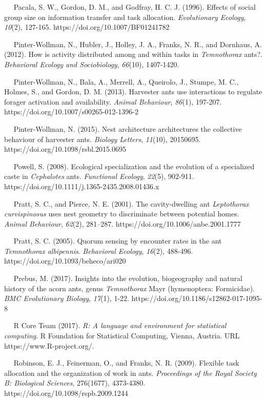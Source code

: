 \documentclass[3p]{elsarticle} %
\begin{document}
~~ Pacala, S. W., Gordon, D. M., and Godfray, H. C. J. (1996). Effects
of social group size on information transfer and task allocation.
\emph{Evolutionary Ecology}, \emph{10}(2), 127-165.
https://doi.org/10.1007/BF01241782

~~ Pinter-Wollman, N., Hubler, J., Holley, J. A., Franks, N. R., and
Dornhaus, A. (2012). How is activity distributed among and within tasks
in \emph{Temnothorax} ants?. \emph{Behavioral Ecology and Sociobiology},
\emph{66}(10), 1407-1420.

~~ Pinter-Wollman, N., Bala, A., Merrell, A., Queirolo, J., Stumpe, M.
C., Holmes, S., and Gordon, D. M. (2013). Harvester ants use
interactions to regulate forager activation and availability.
\emph{Animal Behaviour}, \emph{86}(1), 197-207.
https://doi.org/10.1007/s00265-012-1396-2

~~ Pinter-Wollman, N. (2015). Nest architecture architectures the
collective behaviour of harvester ants. \emph{Biology Letters},
\emph{11}(10), 20150695. https://doi.org/10.1098/rsbl.2015.0695

~~ Powell, S. (2008). Ecological specialization and the evolution of a
specialized caste in \emph{Cephalotes} ants. \emph{Functional Ecology},
\emph{22}(5), 902-911. https://doi.org/10.1111/j.1365-2435.2008.01436.x

~~ Pratt, S. C., and Pierce, N. E. (2001). The cavity-dwelling ant
\emph{Leptothorax curvispinosus} uses nest geometry to discriminate
between potential homes. \emph{Animal Behaviour}, \emph{62}(2),
281--287. https://doi.org/10.1006/anbe.2001.1777

~~ Pratt, S. C. (2005). Quorum sensing by encounter rates in the ant
\emph{Temnothorax albipennis}. \emph{Behavioral Ecology}, \emph{16}(2),
488-496. https://doi.org/10.1093/beheco/ari020

~~ Prebus, M. (2017). Insights into the evolution, biogeography and
natural history of the acorn ants, genus \emph{Temnothorax} Mayr
(hymenoptera: Formicidae). \emph{BMC Evolutionary Biology},
\emph{17}(1), 1-22. https://doi.org/10.1186/s12862-017-1095-8

~~ R Core Team (2017). \emph{R: A language and environment for
statistical computing}. R Foundation for Statistical Computing, Vienna,
Austria. URL https://www.R-project.org/.

~~ Robinson, E. J., Feinerman, O., and Franks, N. R. (2009). Flexible
task allocation and the organization of work in ants. \emph{Proceedings
of the Royal Society B: Biological Sciences}, 276(1677), 4373-4380.
https://doi.org/10.1098/rspb.2009.1244
\end{document}
